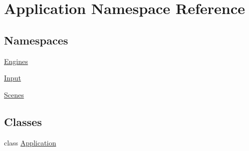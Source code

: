 \hypertarget{namespaceApplication}{}\section{Application Namespace Reference}
\label{namespaceApplication}
\subsection*{Namespaces}
\begin{DoxyCompactItemize}
\item 
 \mbox{\hyperlink{namespaceApplication_1_1Engines}{Engines}}
\item 
 \mbox{\hyperlink{namespaceApplication_1_1Input}{Input}}
\item 
 \mbox{\hyperlink{namespaceApplication_1_1Scenes}{Scenes}}
\end{DoxyCompactItemize}
\subsection*{Classes}
\begin{DoxyCompactItemize}
\item 
class \mbox{\hyperlink{classApplication_1_1Application}{Application}}
\end{DoxyCompactItemize}
